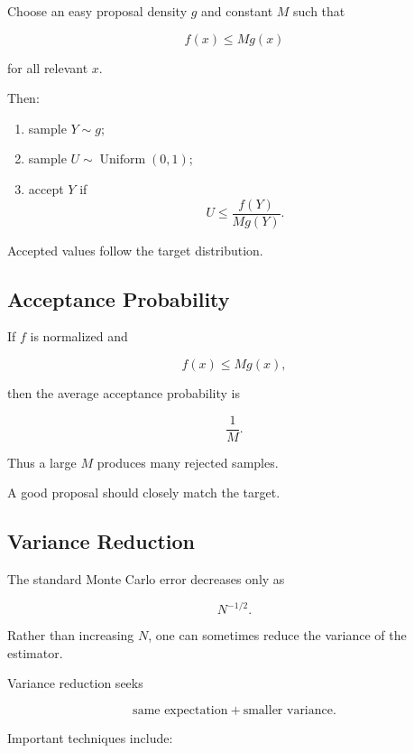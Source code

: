 Choose an easy proposal density \(g\) and constant \(M\) such that

\[
\boxed{
f(x)
\leq
Mg(x)
}
\]

for all relevant \(x\).

Then:

\begin{enumerate}
    \item sample \(Y\sim g\);
    \item sample \(U\sim\operatorname{Uniform}(0,1)\);
    \item accept \(Y\) if
    \[
    U
    \leq
    \frac{
    f(Y)
    }{
    Mg(Y)
    }.
    \]
\end{enumerate}

Accepted values follow the target distribution.

\subsection{Acceptance Probability}
\label{subsec:acceptance-probability}

If \(f\) is normalized and

\[
f(x)\leq Mg(x),
\]

then the average acceptance probability is

\[
\boxed{
\frac1M.
}
\]

Thus a large \(M\) produces many rejected samples.

A good proposal should closely match the target.

\subsection{Variance Reduction}
\label{subsec:variance-reduction}

The standard Monte Carlo error decreases only as

\[
N^{-1/2}.
\]

Rather than increasing \(N\), one can sometimes reduce the variance of the
estimator.

Variance reduction seeks

\[
\boxed{
\text{same expectation}
+
\text{smaller variance}.
}
\]

Important techniques include:

